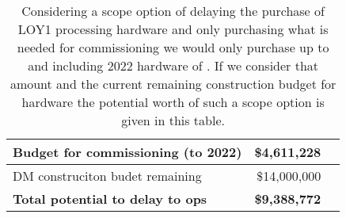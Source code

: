 \tiny \begin{longtable} { |p{}  |r  |r |} 
\caption{Considering a scope option of delaying the purchase of LOY1 processing hardware and only purchasing what is needed for commissioning we would only purchase up to and including 2022 hardware of . If we consider that amount and the current remaining construction budget for hardware the potential worth of such a scope option is given in this table. \label{tab:Scope}}\\ 
\hline 
{Budget for commissioning (to 2022)}&{\$4,611,228} \\ \hline
{DM construciton budet remaining}&{\$14,000,000} \\ \hline
\textbf{Total potential to delay to ops }&\textbf{\$9,388,772} \\ \hline
\end{longtable} \normalsize
